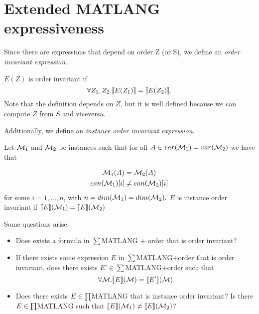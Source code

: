 \section{Extended MATLANG expressiveness}

Since there are expressions that depend on order Z (or S), we define an \textit{order invariant expression}.

$E(Z)$ is order invariant if $$\forall Z_1, Z_2. \llbracket E(Z_1) \rrbracket=\llbracket E(Z_2) \rrbracket.$$
Note that the definition depends on $Z$, but it is well defined because we can compute $Z$ from $S$ and viceversa.

Additionally, we define an \textit{instance order invariant expression}.

Let $\mathcal{M}_1$ and $\mathcal{M}_2$ be instances such that for all $A\in var(\mathcal{M}_1)=var(\mathcal{M}_2)$ we have that

\begin{align*}
	\mathcal{M}_1(A)&=\mathcal{M}_2(A) \\
	can(\mathcal{M}_1)[i]&\neq can(\mathcal{M}_2)[i]
\end{align*}
for some $i=1, \ldots, n$, with $n=dim(\mathcal{M}_1)=dim(\mathcal{M}_2).$ $E$ is instance order invariant if $\llbracket E \rrbracket(\mathcal{M}_1)=\llbracket E \rrbracket(\mathcal{M}_2)$

Some questions arise.

\begin{itemize}
	\item Does exists a formula in $\sum$MATLANG + order that is order invariant?
	\item If there exists some expression $E$ in $\sum$MATLANG+order that is order invariant, does there exists $E'\in\sum$MATLANG+order such that $$\forall\mathcal{M}.\llbracket E \rrbracket(\mathcal{M})=\llbracket E' \rrbracket(\mathcal{M})$$
	\item Does there exists $E\in\textstyle\prod$MATLANG that is instance order invariant? Is there $E\in\textstyle\prod$MATLANG such that $\llbracket E \rrbracket(\mathcal{M}_1)\neq\llbracket E \rrbracket(\mathcal{M}_2)$?
	
\end{itemize}

\label{expressiveness}